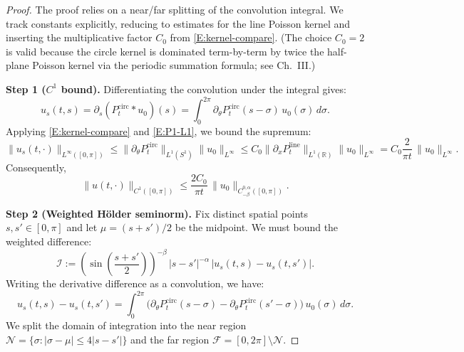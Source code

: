 \documentclass{amsart}
\begin{document}
\begin{proof}
The proof relies on a near/far splitting of the convolution integral. We track constants explicitly, reducing to estimates for the line Poisson kernel and inserting the multiplicative factor \(C_0\) from \eqref{E:kernel-compare}. (The choice $C_0=2$ is valid because the circle kernel is dominated term-by-term by twice the half-plane Poisson kernel via the periodic summation formula; see \cite{stein1970singular} Ch.~III.)

\textbf{Step 1 ($C^1$ bound).}
Differentiating the convolution under the integral gives:
\[
u_s(t,s)=\partial_s(P^{\mathrm{circ}}_t*u_0)(s)
=\int_{0}^{2\pi}\partial_\theta P^{\mathrm{circ}}_t(s-\sigma)\,u_0(\sigma)\,d\sigma.
\]
Applying \eqref{E:kernel-compare} and \eqref{E:P1-L1}, we bound the supremum:
\[
\|u_s(t,\cdot)\|_{L^\infty([0,\pi])}
\le \|\partial_\theta P^{\mathrm{circ}}_t\|_{L^1(S^1)}\|u_0\|_{L^\infty}
\le C_0\|\partial_x P^{\mathrm{line}}_t\|_{L^1(\mathbb R)}\|u_0\|_{L^\infty}
= C_0\frac{2}{\pi t}\,\|u_0\|_{L^\infty}.
\]
Consequently,
\[
\|u(t,\cdot)\|_{C^1([0,\pi])}\le \frac{2C_0}{\pi t}\,\|u_0\|_{C^{0,\alpha}_{-\beta}([0,\pi])}.
\]

\textbf{Step 2 (Weighted H\"{o}lder seminorm).}
Fix distinct spatial points $s, s' \in [0,\pi]$ and let $\mu=(s+s')/2$ be the midpoint. We must bound the weighted difference:
\[
\mathcal I := \left(\sin\left(\frac{s+s'}{2}\right)\right)^{-\beta}\,|s-s'|^{-\alpha}\,|u_s(t,s)-u_s(t,s')|.
\]
Writing the derivative difference as a convolution, we have:
\[
u_s(t,s)-u_s(t,s')
=\int_0^{2\pi}\big(\partial_\theta P^{\mathrm{circ}}_t(s-\sigma)-\partial_\theta P^{\mathrm{circ}}_t(s'-\sigma)\big)\,u_0(\sigma)\,d\sigma.
\]
We split the domain of integration into the near region \(\mathcal N=\{\sigma: |\sigma-\mu|\le 4|s-s'|\}\) and the far region \(\mathcal F=[0,2\pi]\setminus\mathcal N\).


\end{proof}
\end{document}
